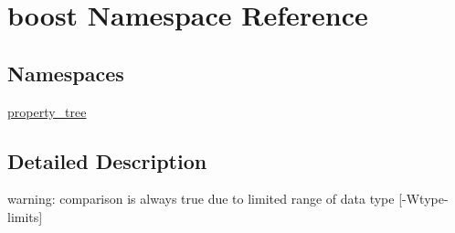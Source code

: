 \hypertarget{namespaceboost}{\section{boost Namespace Reference}
\label{namespaceboost}
}
\subsection*{Namespaces}
\begin{DoxyCompactItemize}
\item 
\hyperlink{namespaceboost_1_1property__tree}{property\-\_\-tree}
\end{DoxyCompactItemize}


\subsection{Detailed Description}
warning\-: comparison is always true due to limited range of data type \mbox{[}-\/\-Wtype-\/limits\mbox{]} 